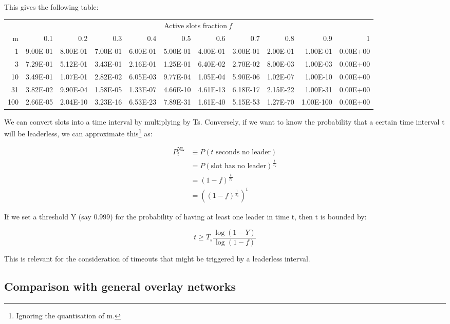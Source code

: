\documentclass[11pt,a4paper]{article}
\begin{document}
This gives the following table:

{\footnotesize
\begin{longtable}[]{r|rrrrrrrrrr}
\toprule
  & \multicolumn{10}{c}{Active slots fraction \emph{f}}\tabularnewline
m & 0.1 & 0.2 & 0.3 & 0.4 & 0.5 & 0.6 & 0.7 & 0.8 & 0.9 & 1\tabularnewline
\midrule
\endhead

1 & 9.00E-01 & 8.00E-01 & 7.00E-01 & 6.00E-01 & 5.00E-01 & 4.00E-01 &
3.00E-01 & 2.00E-01 & 1.00E-01 & 0.00E+00\tabularnewline
3 & 7.29E-01 & 5.12E-01 & 3.43E-01 & 2.16E-01 & 1.25E-01 & 6.40E-02 &
2.70E-02 & 8.00E-03 & 1.00E-03 & 0.00E+00\tabularnewline
10 & 3.49E-01 & 1.07E-01 & 2.82E-02 & 6.05E-03 & 9.77E-04 & 1.05E-04 &
5.90E-06 & 1.02E-07 & 1.00E-10 & 0.00E+00\tabularnewline
31 & 3.82E-02 & 9.90E-04 & 1.58E-05 & 1.33E-07 & 4.66E-10 & 4.61E-13 &
6.18E-17 & 2.15E-22 & 1.00E-31 & 0.00E+00\tabularnewline
100 & 2.66E-05 & 2.04E-10 & 3.23E-16 & 6.53E-23 & 7.89E-31 & 1.61E-40 &
5.15E-53 & 1.27E-70 & 1.00E-100 & 0.00E+00\tabularnewline
\bottomrule
\end{longtable}
}

We can convert slots into a time interval by multiplying by Ts.
Conversely, if we want to know the probability that a certain time
interval t will be leaderless, we can approximate this\footnote{Ignoring
  the quantisation of m.} as:

\begin{align*}
P_{t}^{\text{NL}} &\equiv P(t \text{ seconds no leader}) \\
                  &= {P(\text{slot has no leader})}^{\frac{t}{T_s}} \\
                  &= (1 - f)^{\frac{t}{T_s}} \\
                  &= \left( (1 - f)^{\frac{1}{T_s}} \right)^t
\end{align*}

If we set a threshold Y (say 0.999) for the probability of having at
least one leader in time t, then t is bounded by:

\begin{equation*}
t \geq T_{s}\frac{\log(1 - Y)}{\log(1 - f)}
\end{equation*}

This is relevant for the consideration of timeouts that might be
triggered by a leaderless interval.

\subsection{Comparison with general overlay networks}
\label{comparison-with-general-overlay-networks}
\end{document}
